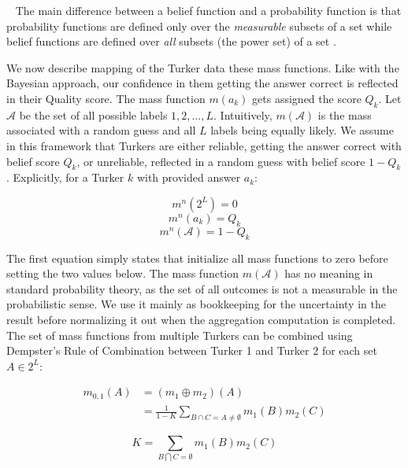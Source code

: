 ~ The main difference between a belief function and a probability function is that probability functions are defined only over the \textit{measurable} subsets of a set while belief functions are defined over \textit{all} subsets (the power set) of a set \cite{shafer1976mathematical}.

We now describe mapping of the Turker data these mass functions.  Like with the Bayesian approach, our confidence in them getting the answer correct is reflected in their Quality score.  The mass function $m(a_{k})$ gets assigned the score $Q_{k}$.  Let $\mathcal{A}$ be the set of all possible labels ${1,2,...,L}$.  Intuitively, $m(\mathcal{A})$ is the mass associated with a random guess and all $L$ labels being equally likely.  We assume in this framework that Turkers are either reliable, getting the answer correct with belief score $Q_{k}$, or unreliable, reflected in a random guess with belief score $1-Q_{k}$.  Explicitly, for a Turker $k$ with provided answer $a_{k}$:

\begin{equation}
m^{n}(2^{L}) = 0
\end{equation}
\begin{equation}
\label{eq:mass1}
m^{n}(a_{k}) = Q_{k}
\end{equation}
\begin{equation}
\label{eq:mass2}
m^{n}(\mathcal{A}) = 1-Q_{k}
\end{equation}

The first equation simply states that initialize all mass functions to zero before setting the two values below.  The mass function $m(\mathcal{A})$ has no meaning in standard probability theory, as the set of all outcomes is not a measurable in the probabilistic sense.  We use it mainly as bookkeeping for the uncertainty in the result before normalizing it out when the aggregation computation is completed.  The set of mass functions from multiple Turkers can be combined using Dempster's Rule of Combination between Turker 1 and Turker 2 for each set $A\in2^{L}$:

\begin{equation}
\begin{split}
\label{eq:DS_combo}
m_{0,1}(A) &=(m_{1}\oplus m_{2})(A)\\
                   &=\frac{1}{1-K} \sum_{B\cap C=A\neq\emptyset} m_{1}(B)m_{2}(C)
\end{split}
\end{equation}

\begin{equation}
K=\sum_{B\bigcap C=\emptyset}m_{1}(B)m_{2}(C)
\end{equation}


